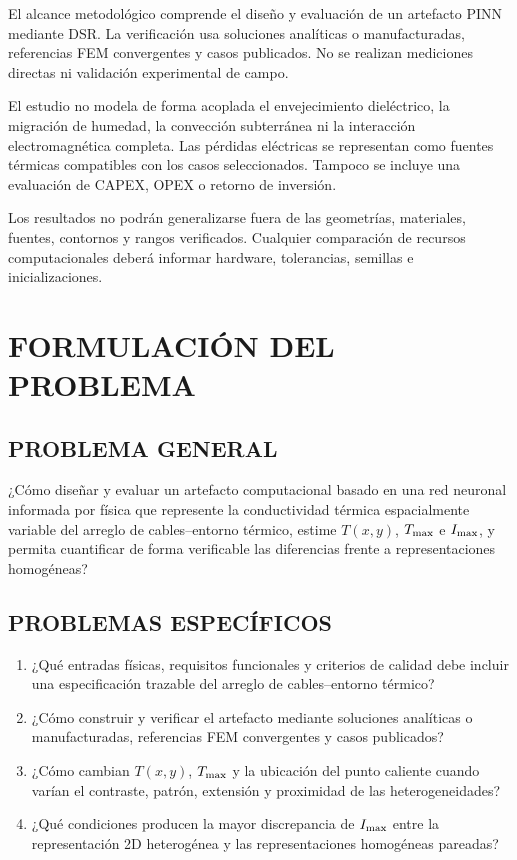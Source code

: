 El alcance metodológico comprende el diseño y evaluación de un artefacto PINN mediante DSR. La verificación usa soluciones analíticas o manufacturadas, referencias FEM convergentes y casos publicados. No se realizan mediciones directas ni validación experimental de campo.

El estudio no modela de forma acoplada el envejecimiento dieléctrico, la migración de humedad, la convección subterránea ni la interacción electromagnética completa. Las pérdidas eléctricas se representan como fuentes térmicas compatibles con los casos seleccionados. Tampoco se incluye una evaluación de CAPEX, OPEX o retorno de inversión.

Los resultados no podrán generalizarse fuera de las geometrías, materiales, fuentes, contornos y rangos verificados. Cualquier comparación de recursos computacionales deberá informar hardware, tolerancias, semillas e inicializaciones.

\section{FORMULACIÓN DEL PROBLEMA}
\label{sec:formulacion-problema}

\subsection{PROBLEMA GENERAL}

¿Cómo diseñar y evaluar un artefacto computacional basado en una red neuronal informada por física que represente la conductividad térmica espacialmente variable del arreglo de cables--entorno térmico, estime $T(x,y)$, $T_{\max}$ e $I_{\max}$, y permita cuantificar de forma verificable las diferencias frente a representaciones homogéneas?

\subsection{PROBLEMAS ESPECÍFICOS}

\begin{enumerate}[label=PE\arabic*.]
  \item ¿Qué entradas físicas, requisitos funcionales y criterios de calidad debe incluir una especificación trazable del arreglo de cables--entorno térmico?
  \item ¿Cómo construir y verificar el artefacto mediante soluciones analíticas o manufacturadas, referencias FEM convergentes y casos publicados?
  \item ¿Cómo cambian $T(x,y)$, $T_{\max}$ y la ubicación del punto caliente cuando varían el contraste, patrón, extensión y proximidad de las heterogeneidades?
  \item ¿Qué condiciones producen la mayor discrepancia de $I_{\max}$ entre la representación 2D heterogénea y las representaciones homogéneas pareadas?
\end{enumerate}

